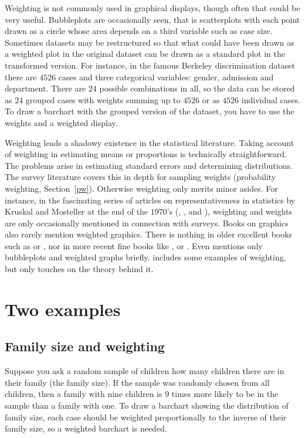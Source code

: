 \documentclass{svmult}
\begin{document}
Weighting is not commonly used in graphical displays, though often that could be very useful.  Bubbleplots are occasionally seen, that is scatterplots with each point drawn as a circle whose area depends on a third variable such as case size.  Sometimes datasets may be restructured so that what could have been drawn as a weighted plot in the original dataset can be drawn as a standard plot in the transformed version.  For instance, in the famous Berkeley discrimination dataset \citep{bickel:1975} there are $4526$ cases and three categorical variables: gender, admission and department.  There are $24$ possible combinations in all, so the data can be stored as  $24$ grouped cases with weights summing up to $4526$ or as  $4526$ individual cases.  To draw a barchart with the grouped version of the dataset, you have to use the weights and a weighted display.

Weighting leads a shadowy existence in the statistical literature.  Taking account of weighting in estimating means or proportions is technically straightforward.  The problems arise in estimating standard errors and determining distributions.  The survey literature covers this in depth for sampling weights (probability weighting, Section~\ref{pw}). Otherwise weighting only merits minor asides.  For instance, in the fascinating series of articles on representativeness in statistics by Kruskal and Mosteller at the end of the $1970$'s (\cite{kruskal1:1979}, \cite{kruskal2:1979}, \cite{kruskal3:1979} and \cite{kruskal:1980}), weighting and weights are only occasionally mentioned in connection with surveys.  Books on graphics also rarely mention weighted graphics.  There is nothing in older excellent books such as \cite{chambers:1983} or \cite{cleveland:1994}, nor in more recent fine books like \cite{Murrell:2005}, \cite{young:2006} or \cite{cook:2007}.  Even \cite{wilkinson:2005} mentions only bubbleplots and weighted graphs briefly.  \cite{unwin:2006} includes some examples of weighting, but only touches on the theory behind it.

\section{Two examples}
\label{exs}

\subsection{Family size and weighting}
\label{family}
Suppose you ask a random sample of children how many children there are in their family (the family size).  If the sample was randomly chosen from all children, then a family with nine children is $9$ times more likely to be in the sample than a family with one.  To draw a barchart showing the distribution of family size, each case should be weighted proportionally to the inverse of their family size, so a weighted barchart is needed.
\end{document}

